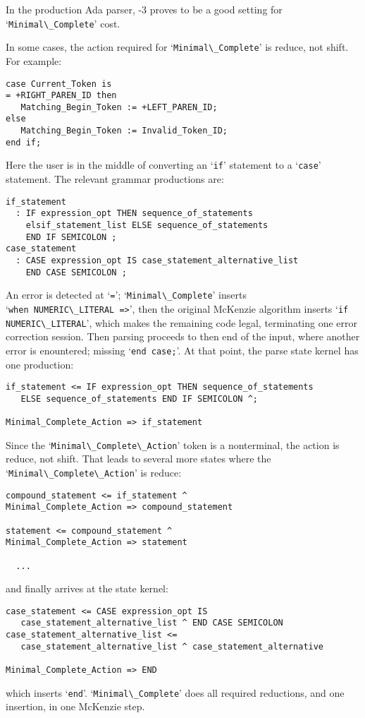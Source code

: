 \documentclass{article}
\newcommand{\code}[1]{`\lstinline|#1|'}
\begin{document}
In the production Ada parser, -3 proves to be a good setting for\\
\code{Minimal\_Complete} cost.

In some cases, the action required for \code{Minimal\_Complete} is
reduce, not shift. For example:
\begin{lstlisting}
case Current_Token is
= +RIGHT_PAREN_ID then
   Matching_Begin_Token := +LEFT_PAREN_ID;
else
   Matching_Begin_Token := Invalid_Token_ID;
end if;
\end{lstlisting}
Here the user is in the middle of converting an \code{if} statement to
a \code{case} statement. The relevant grammar productions are:
\begin{verbatim}
if_statement
  : IF expression_opt THEN sequence_of_statements
    elsif_statement_list ELSE sequence_of_statements
    END IF SEMICOLON ;
case_statement
  : CASE expression_opt IS case_statement_alternative_list
    END CASE SEMICOLON ;
\end{verbatim}
An error is detected at \code{=}; \code{Minimal\_Complete} inserts\\
\code{when NUMERIC\_LITERAL =>}, then the original McKenzie algorithm
inserts \code{if NUMERIC\_LITERAL}, which makes the remaining code
legal, terminating one error correction session. Then parsing proceeds
to then end of the input, where another error is enountered; missing
\code{end case;}. At that point, the parse state kernel has one
production:
\begin{verbatim}
if_statement <= IF expression_opt THEN sequence_of_statements
   ELSE sequence_of_statements END IF SEMICOLON ^;

Minimal_Complete_Action => if_statement
\end{verbatim}
Since the \code{Minimal\_Complete\_Action} token is a nonterminal, the action
is reduce, not shift. That leads to several more states where the\\
\code{Minimal\_Complete\_Action} is reduce:
\begin{verbatim}
compound_statement <= if_statement ^
Minimal_Complete_Action => compound_statement

statement <= compound_statement ^
Minimal_Complete_Action => statement

  ...
\end{verbatim}

and finally arrives at the
state kernel:
\begin{verbatim}
case_statement <= CASE expression_opt IS
   case_statement_alternative_list ^ END CASE SEMICOLON
case_statement_alternative_list <=
   case_statement_alternative_list ^ case_statement_alternative

Minimal_Complete_Action => END
\end{verbatim}
which inserts \code{end}. \code{Minimal\_Complete} does all required
reductions, and one insertion, in one McKenzie step.
\end{document}

